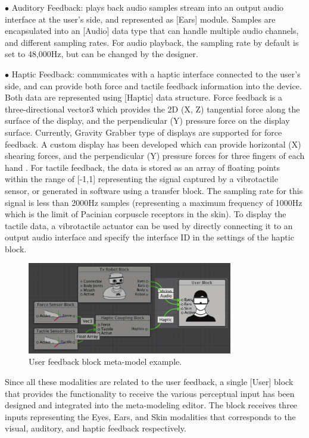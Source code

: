 $\bullet$  Auditory Feedback: plays back audio samples stream into an output audio interface at the user's side, and represented as [Ears] module. Samples are encapsulated into an [Audio] data type that can handle multiple audio channels, and different sampling rates. For audio playback, the sampling rate by default is set to 48,000Hz, but can be changed by the designer.

$\bullet$ Haptic Feedback: communicates with a haptic interface connected to the user's side, and can provide both force and tactile feedback information into the device. Both data are represented using [Haptic] data structure. Force feedback is a three-directional vector3 which provides the 2D (X, Z) tangential force along the surface of the display, and the perpendicular (Y) pressure force on the display surface. Currently, Gravity Grabber \cite{minamizawa2007gravity} type of displays are supported for force feedback. A custom display has been developed which can provide horizontal (X) shearing forces, and the perpendicular (Y) pressure forces for three fingers of each hand . For tactile feedback, the data is stored as an array of floating points within the range of [-1,1] representing the signal captured by a vibrotactile sensor, or generated in software using a transfer block. The sampling rate for this signal is less than 2000Hz samples (representing a maximum frequency of 1000Hz which is the limit of Pacinian corpuscle receptors in the skin). To display the tactile data, a vibrotactile actuator can be used by directly connecting it to an output audio interface and specify the interface ID in the settings of the haptic block.

\begin{figure}[htbp]
\centering
  \captionsetup{justification=centering}
\includegraphics[width=0.8\textwidth]{figures/system/Blocks/UserBlock.pdf}
\caption{User feedback block meta-model example.}
  \label{fig:system-userblock}
\end{figure}

Since all these modalities are related to the user feedback, a single [User] block  that provides the functionality to receive the various perceptual input has been designed and integrated into the meta-modeling editor. The block receives three inputs representing the Eyes, Ears, and Skin modalities that corresponds to the visual, auditory, and haptic feedback respectively.



